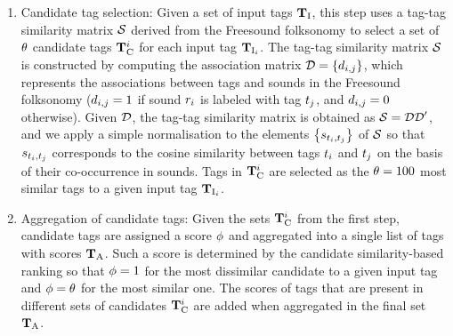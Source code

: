 \begin{enumerate}
\item Candidate tag selection: Given a set of input tags $\mathbf{T}_{\text{I}}$, this step uses a tag-tag similarity matrix $\mathcal{S}$ derived from the Freesound folksonomy to select a set of $\theta$ candidate tags $\mathbf{T}_{\text{C}}^i$ for each input tag $\mathbf{T}_{\text{I}_i}$. The tag-tag similarity matrix $\mathcal{S}$ is constructed by computing the association matrix $\mathcal{D} = \left\{ d_{i,j} \right\}$, which represents the associations between tags and sounds in the Freesound folksonomy ($d_{i,j} = 1$ if sound $r_i$ is labeled with tag $t_j$, and $d_{i,j} = 0$ otherwise). %
Given $\mathcal{D}$, the tag-tag similarity matrix is obtained as $\mathcal{S} = \mathcal{DD}'$, and we apply a simple normalisation to the elements $\left\{ s_{t_i,t_j} \right\}$ of $\mathcal{S}$ so that $s_{t_i,t_j}$ corresponds to the cosine similarity between tags $t_i$ and $t_j$ on the basis of their co-occurrence in sounds. Tags in $\mathbf{T}_{\text{C}}^i$ are selected as the $\theta=100$ most similar tags to a given input tag $\mathbf{T}_{\text{I}_i}$.

\item Aggregation of candidate tags: Given the sets $\mathbf{T}_{\text{C}}^i$ from the first step, candidate tags are assigned a score $\phi$ and aggregated into a single list of tags with scores $\mathbf{T}_{\text{A}}$. Such a score is determined by the candidate similarity-based ranking so that $\phi=1$ for the most dissimilar candidate to a given input tag and $\phi=\theta$ for the most similar one. The scores of tags that are present in different sets of candidates $\mathbf{T}_{\text{C}}^i$ are added when aggregated in the final set $\mathbf{T}_{\text{A}}$.


\end{enumerate}
